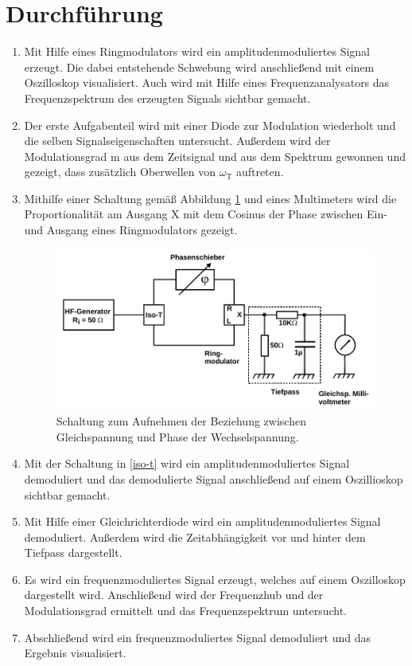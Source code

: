 \section{Durchf\"{u}hrung}
\begin{enumerate}
\item
\label{par:a}
Mit Hilfe eines Ringmodulators wird ein amplitudenmoduliertes Signal erzeugt. Die dabei entstehende Schwebung wird anschließend mit einem
Oszilloskop visualisiert. Auch wird mit Hilfe eines Frequenzanalysators das Frequenzspektrum des erzeugten Signals sichtbar gemacht.

\item
\label{par:b}
Der erste Aufgabenteil wird mit einer Diode zur Modulation wiederholt und die selben Signalseigenschaften untersucht.
Außerdem wird der Modulationsgrad m aus dem Zeitsignal und aus dem Spektrum gewonnen und gezeigt, dass zusätzlich Oberwellen von $\omega_\text{T}$ auftreten.

\item
\label{par:c}
Mithilfe einer Schaltung gemäß Abbildung \ref{Abb14} und eines Multimeters wird die Proportionalität am Ausgang X mit dem Cosinus der Phase zwischen
Ein- und Ausgang eines Ringmodulators gezeigt.

\begin{figure}
	\centering
	\includegraphics[width=\textwidth]{img/Abb14.pdf}
	\caption{Schaltung zum Aufnehmen der Beziehung zwischen Gleichspannung und Phase der Wechselspannung. \cite{FP}}
	\label{Abb14}
\end{figure}

\item
\label{par:d}
Mit der Schaltung in \autoref{iso-t} wird ein amplitudenmoduliertes Signal demoduliert und das demodulierte Signal anschließend auf einem Oszillioskop sichtbar gemacht.

\item
\label{par:e}
Mit Hilfe einer Gleichrichterdiode wird ein amplitudenmoduliertes Signal demoduliert.
Außerdem wird die Zeitabhängigkeit vor und hinter dem Tiefpass dargestellt.

\item
\label{par:f}
Es wird ein frequenzmoduliertes Signal erzeugt, welches auf einem Oszilloskop dargestellt wird. Anschließend wird der Frequenzhub und
der Modulationsgrad ermittelt und das Frequenzspektrum untersucht.

\item
\label{par:g}
Abschließend wird ein frequenzmoduliertes Signal demoduliert und das Ergebnis visualisiert.
\end{enumerate}
